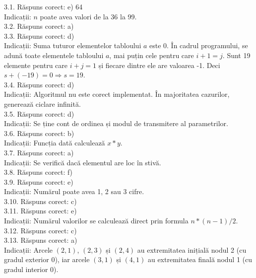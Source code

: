 3.1. Răspuns corect: e) 64\\
Indicații: $n$ poate avea valori de la 36 la 99.\\

3.2. Răspuns corect: a)\\

3.3. Răspuns corect: d)\\
Indicații: Suma tuturor elementelor tabloului $a$ este 0. În cadrul programului, se adună toate elementele tabloului $a$, mai puțin cele pentru care $i+1=j$. Sunt 19 elemente pentru care $i+j=1$ și fiecare dintre ele are valoarea -1. Deci $s+(-19)=0 \Rightarrow s=19$.\\

3.4. Răspuns corect: d)\\
Indicații: Algoritmul nu este corect implementat. În majoritatea cazurilor, generează ciclare infinită.\\

3.5. Răspuns corect: d)\\
Indicații: Se ține cont de ordinea și modul de transmitere al parametrilor.\\

3.6. Răspuns corect: b)\\
Indicații: Funcția dată calculează $x*y$.\\

3.7. Răspuns corect: a)\\
Indicații: Se verifică dacă elementul are loc în stivă.\\

3.8. Răspuns corect: f)\\

3.9. Răspuns corect: e)\\
Indicații: Numărul poate avea 1, 2 sau 3 cifre.\\

3.10. Răspuns corect: c)\\

3.11. Răspuns corect: e)\\
Indicații: Numărul valorilor se calculează direct prin formula $n*(n-1)/2$.\\

3.12. Răspuns corect: c)\\

3.13. Răspuns corect: a)\\
Indicații: Arcele $(2,1)$, $(2,3)$ și $(2,4)$ au extremitatea inițială nodul 2 (cu gradul exterior 0), iar arcele $(3,1)$ și $(4,1)$ au extremitatea finală nodul 1 (cu gradul interior 0).\\

